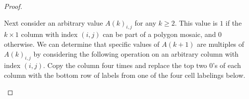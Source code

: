 \documentclass[12pt]{article}
\theoremstyle{plain}
\theoremstyle{definition}
\theoremstyle{remark}
\theoremstyle{definition}
\newcommand{\cell}[4]{ \draw[thick] ( #1 , #2 ) rectangle ( #3 , #4 );}
\newcommand{\lablnode}[3]{\node[shape=circle,draw=none,fill=none, inner sep=0pt,minimum size=5pt] (A) at ( #1 , #2 ) {#3};}
\newcommand{\lablvertex}[3]{\node[shape=circle,draw=none,fill=white, inner sep=2pt,minimum size=5pt] (A) at ( #1 , #2 ) {#3};}
\begin{document}
\begin{proof}
\begin{center}
\end{center}

Next consider an arbitrary value $A(k)_{i,j}$ for any $k \geq 2$. This value is $1$ if the $k \times 1$ column with index $(i,j)$ can be part of a polygon mosaic, and $0$ otherwise. We can determine that specific values of $A(k+1)$ are multiples of $A(k)_{i,j}$ by considering the following operation on an arbitrary column with index $(i,j)$. Copy the column four times and replace the top two $0$'s of each column with the bottom row of labels from one of the four cell labelings below. 

\begin{center}
\end{center}
\end{proof}
\end{document}
